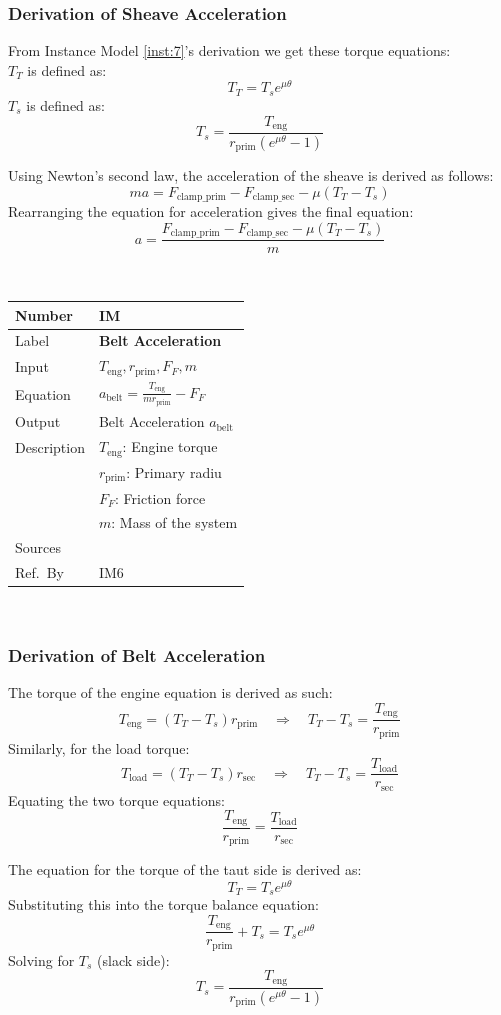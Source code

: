 \documentclass[12pt]{article}
\newcommand{\colAwidth}{0.13\textwidth}
\newcommand{\colBwidth}{0.82\textwidth}
\newcounter{instnum} %
\newcommand{\definstance}[7] {
~\newline
\noindent
\begin{minipage}{\textwidth}
\renewcommand*{\arraystretch}{1.5}
\begin{tabular}{| p{\colAwidth} | p{\colBwidth}|}
  \hline
  \rowcolor[gray]{0.9}
  Number& IM\refstepcounter{instnum}\theinstnum \label{inst:\theinstnum}\\
  \hline
  Label& \bf #1 \\
  \hline
  Input& #2\\
  \hline
  Equation& #3\\
  \hline
  Output& #4\\
  \hline
  Description& #5 \\
  \hline
  Sources& #6 \\
  \hline
  Ref.\ By & #7\\
  \hline
\end{tabular}
\end{minipage}\\
}
\begin{document}
\subsubsection*{Derivation of Sheave Acceleration}
From Instance Model \ref{inst:7}'s derivation we get these torque equations:\\
$T_T$ is defined as: \[T_T = T_s e^{\mu \theta}\]
$T_s$ is defined as: \[T_s = \frac{T_{\text{eng}}}{r_{\text{prim}} (e^{\mu \theta} - 1)}\]

Using Newton's second law, the acceleration of the sheave is derived as follows:
\[ma = F_{\text{clamp\_prim}} - F_{\text{clamp\_sec}} - \mu (T_T - T_s)\]
Rearranging the equation for acceleration gives the final equation:
\[a = \frac{F_{\text{clamp\_prim}} - F_{\text{clamp\_sec}} - \mu (T_T - T_s)}{m}\]



\definstance
{Belt Acceleration}
{$T_{\text{eng}}, r_{\text{prim}}, F_F, m$ } %
{$a_{\text{belt}} = \frac{T_{\text{eng}}}{m r_{\text{prim}}} - F_F$} %
{Belt Acceleration $a_{\text{belt}}$} %
{$T_{\text{eng}}$: Engine torque\\
   &$r_{\text{prim}}$: Primary radiu\\
   &$F_F$: Friction force\\
   &$m$: Mass of the system} %
{} %
{IM6} %
\subsubsection*{Derivation of Belt Acceleration}

The torque of the engine equation is derived as such: \\
\[T_{\text{eng}} = (T_T - T_s) r_{\text{prim}} \quad \Rightarrow \quad T_T - T_s = \frac{T_{\text{eng}}}{r_{\text{prim}}}\]
Similarly, for the load torque: \\
\[T_{\text{load}} = (T_T - T_s) r_{\text{sec}} \quad \Rightarrow \quad T_T - T_s = \frac{T_{\text{load}}}{r_{\text{sec}}}\]
Equating the two torque equations: \\
\[\frac{T_{\text{eng}}}{r_{\text{prim}}} = \frac{T_{\text{load}}}{r_{\text{sec}}}\]
{\newline}

The equation for the torque of the taut side is derived as: \\
\[T_T = T_s e^{\mu \theta}\]
Substituting this into the torque balance equation: \\
\[\frac{T_{\text{eng}}}{r_{\text{prim}}} + T_s = T_s e^{\mu \theta}\]
Solving for \(T_s\) (slack side): \\
\[T_s = \frac{T_{\text{eng}}}{r_{\text{prim}} (e^{\mu \theta} - 1)}\]
{\newline}
\end{document}
